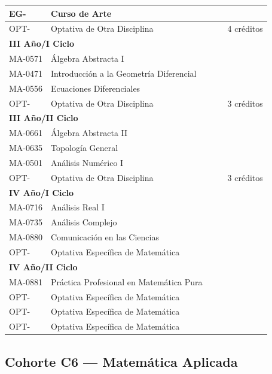 \begin{longtable}{|p{2cm}|p{7cm}|p{1.6cm}|p{1.6cm}|p{2.8cm}|}
EG- & Curso de Arte &  &  &  \\ \hline
OPT- & Optativa de Otra Disciplina &  &  & 4 créditos \\ \hline
\multicolumn{5}{|l|}{\cellcolor[HTML]{E6E6E6}\textbf{III Año/I Ciclo}} \\ \hline
MA-0571 & Álgebra Abstracta I &  &  &  \\ \hline
MA-0471 & Introducción a la Geometría Diferencial &  &  &  \\ \hline
MA-0556 & Ecuaciones Diferenciales &  &  &  \\ \hline
OPT- & Optativa de Otra Disciplina &  &  & 3 créditos \\ \hline
\multicolumn{5}{|l|}{\cellcolor[HTML]{E6E6E6}\textbf{III Año/II Ciclo}} \\ \hline
MA-0661 & Álgebra Abstracta II &  &  &  \\ \hline
MA-0635 & Topología General &  &  &  \\ \hline
MA-0501 & Análisis Numérico I &  &  &  \\ \hline
OPT- & Optativa de Otra Disciplina &  &  & 3 créditos \\ \hline
\multicolumn{5}{|l|}{\cellcolor[HTML]{E6E6E6}\textbf{IV Año/I Ciclo}} \\ \hline
MA-0716 & Análisis Real I &  &  &  \\ \hline
MA-0735 & Análisis Complejo &  &  &  \\ \hline
MA-0880 & Comunicación en las Ciencias &  &  &  \\ \hline
OPT- & Optativa Específica de Matemática &  &  &  \\ \hline
\multicolumn{5}{|l|}{\cellcolor[HTML]{E6E6E6}\textbf{IV Año/II Ciclo}} \\ \hline
MA-0881 & Práctica Profesional en Matemática Pura &  &  &  \\ \hline
OPT- & Optativa Específica de Matemática &  &  &  \\ \hline
OPT- & Optativa Específica de Matemática &  &  &  \\ \hline
OPT- & Optativa Específica de Matemática &  &  &  \\ \hline
\end{longtable}

\subsection{Cohorte C6 --- Matemática Aplicada}
\label{anexo:estudioC6A}

